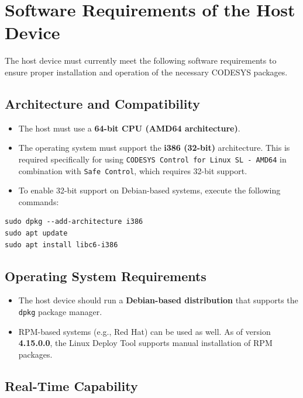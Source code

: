 \documentclass[a4paper,12pt]{article}
\begin{document}
\newpage

\section{Software Requirements of the Host Device}

The host device must currently meet the following software requirements to ensure proper installation and operation of the necessary CODESYS packages.

\subsection*{Architecture and Compatibility}

\begin{itemize}
	\item The host must use a \textbf{64-bit CPU (AMD64 architecture)}.
	\item The operating system must support the \textbf{i386 (32-bit)} architecture. This is required specifically for using \texttt{CODESYS Control for Linux SL - AMD64} in combination with \texttt{Safe Control}, which requires 32-bit support.
	\item To enable 32-bit support on Debian-based systems, execute the following commands:
\end{itemize}

\begin{lstlisting}
sudo dpkg --add-architecture i386
sudo apt update
sudo apt install libc6-i386
\end{lstlisting}

\subsection*{Operating System Requirements}

\begin{itemize}
	\item The host device should run a \textbf{Debian-based distribution} that supports the \texttt{dpkg} package manager.
	\item RPM-based systems (e.g., Red Hat) can be used as well. As of version \textbf{4.15.0.0}, the Linux Deploy Tool supports manual installation of RPM packages.
\end{itemize}

\subsection*{Real-Time Capability}
\end{document}
